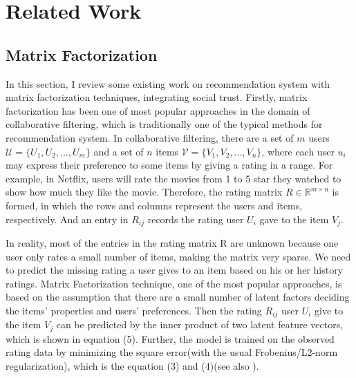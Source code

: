 \section{Related Work}
\subsection{Matrix Factorization}
In this section, I review some existing work on recommendation system with matrix factorization techniques, integrating social trust. Firstly, matrix factorization has been one of most popular approaches in the domain of collaborative filtering, which is traditionally one of the typical methods for recommendation system. In collaborative filtering, there are a set of $m$ users $\mathcal{U} = \{U_1,U_2,...,U_m\}$ and a set of $n$ items $\mathcal{V} = \{V_1,V_2,...,V_n\}$, where each user $u_i$ may express their preference to some items by giving a rating in a range. For example, in Netflix, users will rate the movies from 1 to 5 star they watched to show how much they like the movie. Therefore, the rating matrix $R \in \mathbb{R}^{m \times n}$ is formed, in which the rows and columns represent the users and items, respectively. And an entry in $R_{ij}$ records the rating user $U_i$ gave to the item $V_j$. 

In reality, most of the entries in the rating matrix R are unknown because one user only rates a small number of items, making the matrix very sparse. We need to predict the missing rating a user gives to an item based on his or her history ratings. Matrix Factorization technique, one of the most popular approaches, is based on the assumption that there are a small number of latent factors deciding the items' properties and users' preferences. Then the rating $R_{ij}$ user $U_i$ give to the item $V_j$ can be predicted by the inner product of two latent feature vectors, which is shown in equation (5). Further, the model is trained on the observed rating data by minimizing the square error(with the usual Frobenius/L2-norm regularization), which is the equation (3) and (4)(see also \cite{koren2009matrix}).

